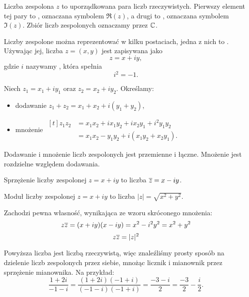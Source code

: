 \begin{definition}
    Liczba zespolona $z$ to uporządkowana para liczb rzeczywistych. Pierwszy element tej pary to , oznaczana symbolem $\Re(z)$, a drugi to , oznaczana symbolem $\Im(z)$. Zbiór liczb zespolonych oznaczamy przez $\mathbb C$.
\end{definition}

Liczby zespolone można reprezentować w kilku postaciach, jedna z nich to . Używając jej, liczba $z = (x, y)$ jest zapisywana jako
$$ z = x + iy, $$
gdzie $i$ nazywamy , która spełnia
$$ i^2 = -1. $$

Niech $z_1 = x_1 + iy_1$ oraz $z_2 = x_2 + iy_2$. Określamy:
\begin{itemize}
    \item dodawanie $z_1 + z_2 = x_1 + x_2 + i(y_1 + y_2)$,
    \item mnożenie $\begin{aligned}[t] z_1z_2 &= x_1x_2 + ix_1y_2 + ix_2y_1 + i^2y_1y_2 \\ &= x_1x_2 - y_1y_2 + i(x_1y_2 + x_2y_1).\end{aligned}$
\end{itemize}

\begin{corollary}
    Dodawanie i mnożenie liczb zespolonych jest przemienne i łączne. Mnożenie jest rozdzielne względem dodawania.
\end{corollary}

\begin{definition}
    Sprzężenie liczby zespolonej $z = x + iy$ to liczba $\overline{z} = x - iy$.
\end{definition}

\begin{definition}
    \label{d:magnitude}
    Moduł liczby zespolonej $z = x + iy$ to liczba $|z| = \sqrt{x^2 + y^2}$.
\end{definition}

Zachodzi pewna własność, wynikająca ze wzoru skróconego mnożenia:
$$ z\overline{z} = (x + iy)(x - iy) = x^2 - i^2y^2 = x^2 + y^2 $$
\begin{equation}
    z\overline{z} = |z|^2
\end{equation}

Powyższa liczba jest liczbą rzeczywistą, więc znaleźliśmy prosty sposób na dzielenie liczb zespolonych przez siebie, mnożąc licznik i mianownik przez sprzężenie mianownika. Na przykład:
$$ \frac{1 + 2i}{-1 - i} = \frac{(1 + 2i)(-1 + i)}{(-1 - i)(-1 + i)} = \frac{-3 -i}{2} = \frac{-3}{2} - \frac{i}{2}. $$

